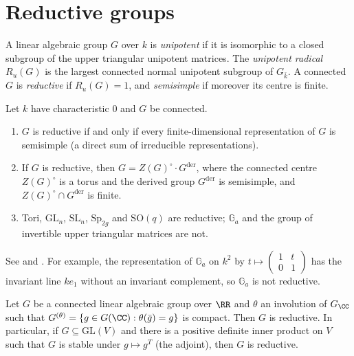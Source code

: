 \section{Reductive groups}\label{algebraic-groups:section-reductive}

\begin{definition}\label{algebraic-groups:definition-reductive}
A linear algebraic group $G$ over $k$ is \emph{unipotent} if it is isomorphic to a closed subgroup of the upper triangular unipotent matrices. The \emph{unipotent radical}
$R_u(G)$ is the largest connected normal unipotent subgroup of $G_{\bar k}$. A connected $G$ is \emph{reductive} if $R_u(G) = 1$, and \emph{semisimple} if moreover its centre is finite.
\end{definition}

\begin{theorem}\label{algebraic-groups:theorem-reductive}
Let $k$ have characteristic $0$ and $G$ be connected.
\begin{enumerate}
\item $G$ is reductive if and only if every finite-dimensional representation of $G$ is semisimple (a direct sum of irreducible representations).
\item If $G$ is reductive, then $G = Z(G)^\circ \cdot G^{\mathrm{der}}$, where the connected centre $Z(G)^\circ$ is a torus and the derived group $G^{\mathrm{der}}$ is semisimple, and
$Z(G)^\circ \cap G^{\mathrm{der}}$ is finite.
\item Tori, $\mathrm{GL}_n$, $\mathrm{SL}_n$, $\mathrm{Sp}_{2g}$ and $\mathrm{SO}(q)$ are reductive; $\mathbb{G}_a$ and the group of invertible upper triangular matrices are not.
\end{enumerate}
\end{theorem}

See \cite{milne-algebraic-groups} and \cite{borel-lag}. For example, the representation of $\mathbb{G}_a$ on $k^2$ by
$t \mapsto \left(\begin{smallmatrix}1 & t \\ 0 & 1\end{smallmatrix}\right)$ has the invariant line $k e_1$ without an invariant complement, so $\mathbb{G}_a$ is not reductive.

\begin{proposition}\label{algebraic-groups:proposition-cartan-involution}
Let $G$ be a connected linear algebraic group over $\RR$ and $\theta$ an involution of $G_\CC$ such that
$G^{(\theta)} = \{g \in G(\CC) : \theta(\bar g) = g\}$ is compact. Then $G$ is reductive. In particular, if $G \subseteq \mathrm{GL}(V)$ and there is a positive definite inner
product on $V$ such that $G$ is stable under $g \mapsto g^T$ (the adjoint), then $G$ is reductive.
\end{proposition}

